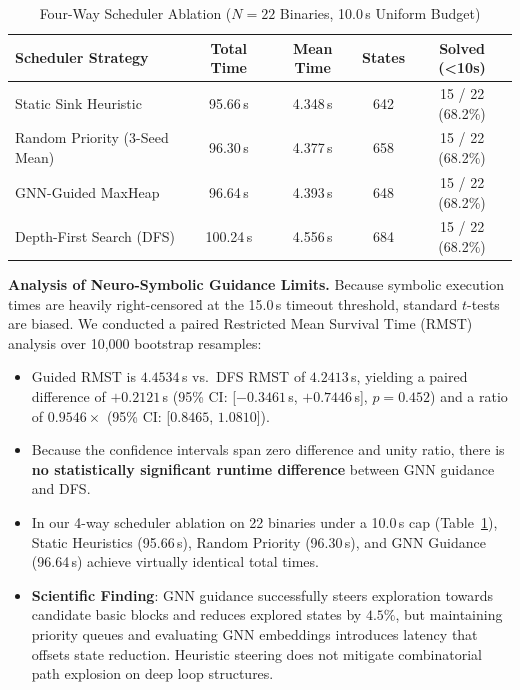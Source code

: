 \documentclass[10pt,conference]{IEEEtran}
\begin{document}
\begin{table}[!t]
\caption{Four-Way Scheduler Ablation ($N = 22$ Binaries, 10.0\,s Uniform Budget)}
\label{tab:scheduler_ablation}
\renewcommand{\arraystretch}{1.0}
\footnotesize
\setlength\tabcolsep{2.5pt}
\begin{tabular}{lcccc}
\toprule
\textbf{Scheduler Strategy} & \textbf{Total Time} & \textbf{Mean Time} & \textbf{States} & \textbf{Solved (<10s)} \\
\midrule
Static Sink Heuristic       & 95.66\,s & 4.348\,s & 642 & 15 / 22 (68.2\%) \\
Random Priority (3-Seed Mean)& 96.30\,s & 4.377\,s & 658 & 15 / 22 (68.2\%) \\
GNN-Guided MaxHeap          & 96.64\,s & 4.393\,s & 648 & 15 / 22 (68.2\%) \\
Depth-First Search (DFS)    & 100.24\,s & 4.556\,s & 684 & 15 / 22 (68.2\%) \\
\bottomrule
\end{tabular}
\end{table}

\textbf{Analysis of Neuro-Symbolic Guidance Limits.} Because symbolic execution times are heavily right-censored at the 15.0\,s
timeout threshold, standard $t$-tests are biased. We conducted a paired Restricted Mean Survival Time (RMST) analysis over 10{,}000
bootstrap resamples:
\begin{itemize}
  \item Guided RMST is $4.4534$\,s vs.\ DFS RMST of $4.2413$\,s, yielding a paired difference of $+0.2121$\,s (95\% CI: [$-0.3461$\,s, $+0.7446$\,s], $p = 0.452$) and a ratio of $0.9546\times$ (95\% CI: [$0.8465$, $1.0810$]).
  \item Because the confidence intervals span zero difference and unity ratio, there is \textbf{no statistically significant runtime difference} between GNN guidance and DFS.
  \item In our 4-way scheduler ablation on 22 binaries under a 10.0\,s cap (Table~\ref{tab:scheduler_ablation}), Static Heuristics (95.66\,s), Random Priority (96.30\,s), and GNN Guidance (96.64\,s) achieve virtually identical total times.
  \item \textbf{Scientific Finding}: GNN guidance successfully steers exploration towards candidate basic blocks and reduces explored states by $4.5\%$, but maintaining priority queues and evaluating GNN embeddings introduces latency that offsets state reduction. Heuristic steering does not mitigate combinatorial path explosion on deep loop structures.
\end{itemize}
\end{document}
